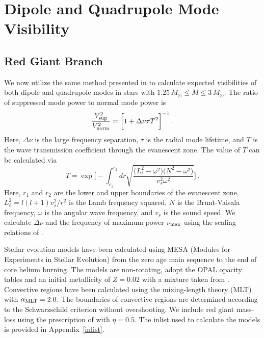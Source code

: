 \section{Dipole and Quadrupole Mode Visibility}\label{visibility}


\subsection{Red Giant Branch}
\label{rgb}


We now utilize the same method presented in \citet{Fuller_2015} to calculate expected visibilities of both dipole and quadrupole modes in stars with $1.25 \, M_\odot \leq M \leq 3 \, M_\odot$. The ratio of suppressed mode power to normal mode power is
\begin{equation}
\label{eqn:vsup}
\frac{V_{\rm sup}^2}{V_{\rm norm}^2} = \bigg[ 1 + \Delta \nu \tau T^2 \bigg]^{-1} \, .
\end{equation}
Here, $\Delta \nu$ is the large frequency separation, $\tau$ is the radial mode lifetime, and $T$ is the wave transmission coefficient through the evanescent zone. The value of $T$ can be calculated via
\begin{equation}
\label{eqn:T}
T  = \exp \bigg[ - \int^{r_2}_{r_1} dr \sqrt{ \frac{ \big( L_\ell^2 - \omega^2 \big) \big(N^2 - \omega^2 \big) }{v_s^2 \omega^2} } \bigg] \, .
\end{equation}
Here, $r_1$ and $r_2$ are the lower and upper boundaries of the evanescent zone, $L_\ell^2 = l(l+1)v_s^2/r^2$ is the Lamb frequency squared, $N$ is the Brunt-Vaisala frequency, $\omega$ is the angular wave frequency, and $v_s$ is the sound speed. We calculate $\Delta \nu$ and the frequency of maximum power $\nu_{\rm max}$ using the scaling relations of \cite{Huber_2011}.

Stellar evolution models have been calculated using MESA (Modules for Experiments in Stellar Evolution) \citep[MESA,release #7456][]{Paxton:11,Paxton:13,Paxton:15} from the zero age main sequence to the end of core helium burning. The models are non-rotating, adopt the OPAL opacity tables \citep{Iglesias:1996} and an initial metallicity of $Z=0.02$ with a mixture taken from \citet{Asplund:2005}.  
Convective regions have been calculated using the mixing-length theory (MLT) with $\alpha_{\rm MLT}=2.0$. The boundaries of convective regions are determined according to the Schwarzschild criterion without overshooting. We include red giant mass-loss using the prescription of \citet{Reimers:1975} with $\eta=0.5$. The inlist used to calculate the models is provided in Appendix~\ref{inlist}.
  
